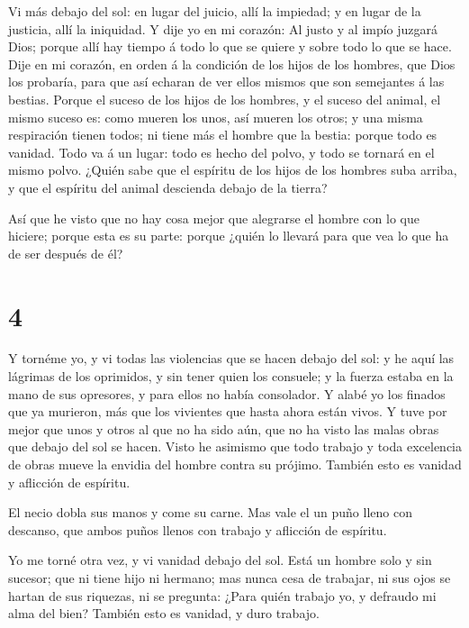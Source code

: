  Vi más debajo del sol: en lugar del juicio, allí la
impiedad; y en lugar de la justicia, allí la iniquidad.  Y
dije yo en mi corazón: Al justo y al impío juzgará Dios; porque allí hay
tiempo á todo lo que se quiere y sobre todo lo que se hace.
 Dije en mi corazón, en orden á la condición de los hijos
de los hombres, que Dios los probaría, para que así echaran de ver ellos
mismos que son semejantes á las bestias.  Porque el suceso
de los hijos de los hombres, y el suceso del animal, el mismo suceso es:
como mueren los unos, así mueren los otros; y una misma respiración
tienen todos; ni tiene más el hombre que la bestia: porque todo es
vanidad.  Todo va á un lugar: todo es hecho del polvo, y
todo se tornará en el mismo polvo.  ¿Quién sabe que el
espíritu de los hijos de los hombres suba arriba, y que el espíritu del
animal descienda debajo de la tierra?

 Así que he visto que no hay cosa mejor que alegrarse el
hombre con lo que hiciere; porque esta es su parte: porque ¿quién lo
llevará para que vea lo que ha de ser después de él?

\hypertarget{section-3}{%
\section{4}\label{section-3}}

 Y tornéme yo, y vi todas las violencias que se hacen debajo
del sol: y he aquí las lágrimas de los oprimidos, y sin tener quien los
consuele; y la fuerza estaba en la mano de sus opresores, y para ellos
no había consolador.  Y alabé yo los finados que ya
murieron, más que los vivientes que hasta ahora están vivos.
 Y tuve por mejor que unos y otros al que no ha sido aún,
que no ha visto las malas obras que debajo del sol se hacen.
 Visto he asimismo que todo trabajo y toda excelencia de
obras mueve la envidia del hombre contra su prójimo. También esto es
vanidad y aflicción de espíritu.

 El necio dobla sus manos y come su carne.  Mas
vale el un puño lleno con descanso, que ambos puños llenos con trabajo y
aflicción de espíritu.

 Yo me torné otra vez, y vi vanidad debajo del sol.
 Está un hombre solo y sin sucesor; que ni tiene hijo ni
hermano; mas nunca cesa de trabajar, ni sus ojos se hartan de sus
riquezas, ni se pregunta: ¿Para quién trabajo yo, y defraudo mi alma del
bien? También esto es vanidad, y duro trabajo.

